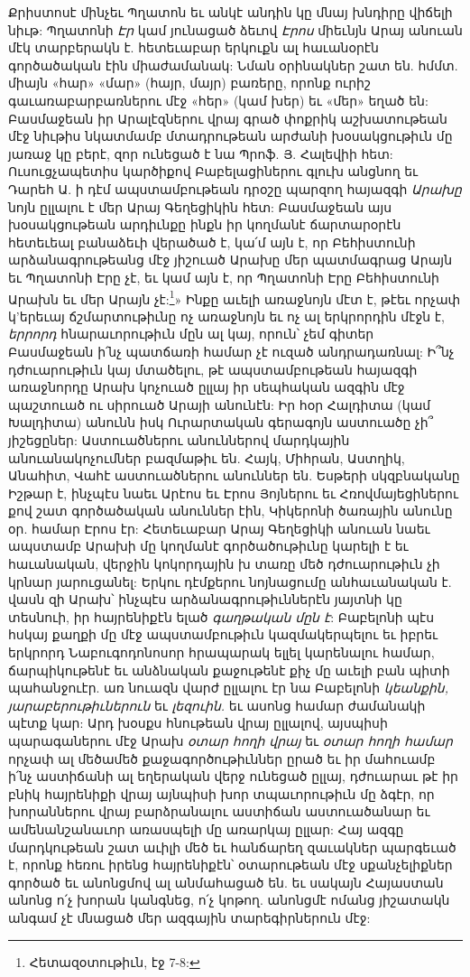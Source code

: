 \documentclass{article}
\begin{document}
{Քրիստոսէ մինչեւ Պղատոն եւ անկէ անդին կը մնայ խնդիրը վիճելի նիւթ: Պղատոնի \emph{Էր} կամ յունացած ձեւով \emph{Էրոս} միեւնյն Արայ անուան մէկ տարբերակն է. հետեւաբար երկուքն ալ հաւանօրէն գործածական էին միաժամանակ: Նման օրինակներ շատ են. հմմտ. միայն «հար» «մար» (հայր, մայր) բառերը, որոնք ուրիշ գաւառաբարբառներու մէջ «հեր» (կամ խեր) եւ «մեր» եղած են: Բասմաջեան իր Արալէզներու վրայ գրած փոքրիկ աշխատութեան մէջ նիւթիս նկատմամբ մտադրութեան արժանի խօսակցութիւն մը յառաջ կը բերէ, զոր ունեցած է նա Պրոֆ. Յ. Հալեվիի հետ: Ուսուցչապետիս կարծիքով Բաբելացիներու գլուխ անցնող եւ Դարեհ Ա. ի դէմ ապստամբութեան դրօշը պարզող հայազգի \emph{Արախը} նոյն ըլլալու է մեր Արայ Գեղեցիկին հետ: Բասմաջեան այս խօսակցութեան արդիւնքը ինքն իր կողմանէ ճարտարօրէն հետեւեալ բանաձեւի վերածած է, կա՛մ այն է, որ Բեհիստունի արձանագրութեանց մէջ յիշուած Արախը մեր պատմագրաց Արայն եւ Պղատոնի Էրը չէ, եւ կամ այն է, որ Պղատոնի Էրը Բեհիստունի Արախն եւ մեր Արայն չէ:\footnote{Հետազօտութիւն, էջ 7-8: }» Ինքը աւելի առաջնոյն մէտ է, թէեւ որչափ կ'երեւայ ճշմարտութիւնը ոչ առաջնոյն եւ ոչ ալ երկրորդին մէջն է, \emph{երրորդ} հնարաւորութիւն մըն ալ կայ, որուն՝ չեմ գիտեր Բասմաջեան ի՛նչ պատճառի համար չէ ուզած անդրադառնալ: Ի՞նչ դժուարութիւն կայ մտածելու, թէ ապստամբութեան հայազգի առաջնորդը Արախ կոչուած ըլլայ իր սեպհական ազգին մէջ պաշտուած ու սիրուած Արայի անունէն: Իր հօր Հալդիտա (կամ Խալդիտա) անունն իսկ Ուրարտական գերագոյն աստուածը չի՞ յիշեցըներ: Աստուածներու անուններով մարդկային անուանակոչումներ բազմաթիւ են. Հայկ, Միհրան, Աստղիկ, Անահիտ, Վահէ աստուածներու անուններ են. Եսթերի սկզբնականը Իշթար է, ինչպէս նաեւ Արէոս եւ Էրոս Յոյներու եւ Հռովմայեցիներու քով շատ գործածական անուններ էին, Կիկերոնի ծառային անունը օր. համար Էրոս էր: Հետեւաբար Արայ Գեղեցիկի անուան նաեւ ապստամբ Արախի մը կողմանէ գործածութիւնը կարելի է եւ հաւանական, վերջին կոկորդային խ տառը մեծ դժուարութիւն չի կրնար յարուցանել: Երկու դէմքերու նոյնացումը անհաւանական է. վասն զի Արախ՝ ինչպէս արձանագրութիւններէն յայտնի կը տեսնուի, իր հայրենիքէն ելած \emph{գաղթական մըն է}: Բաբելոնի պէս հսկայ քաղքի մը մէջ ապստամբութիւն կազմակերպելու եւ իբրեւ երկրորդ Նաբուգոդոնոսոր հրապարակ ելլել կարենալու համար, ճարպիկութենէ եւ անձնական քաջութենէ քիչ մը աւելի բան պիտի պահանջուէր. առ նուազն վարժ ըլլալու էր նա Բաբելոնի \emph{կեանքին, յարաբերութիւներուն} եւ \emph{լեզուին.} եւ ասոնց համար ժամանակի պէտք կար: Արդ խօսքս հնութեան վրայ ըլլալով, այսպիսի պարագաներու մէջ Արախ \emph{օտար հողի վրայ} եւ \emph{օտար հողի համար} որչափ ալ մեծամեծ քաջագործութիւններ ըրած եւ իր մահուամբ ի՛նչ աստիճանի ալ եղերական վերջ ունեցած ըլլայ, դժուարաւ թէ իր բնիկ հայրենիքի վրայ այնպիսի խոր տպաւորութիւն մը ձգէր, որ խորաններու վրայ բարձրանալու աստիճան աստուածանար եւ ամենանշանաւոր առասպելի մը առարկայ ըլլար: Հայ ազգը մարդկութեան շատ աւիլի մեծ եւ հանճարեղ զաւակներ պարգեւած է, որոնք հեռու իրենց հայրենիքէն՝ օտարութեան մէջ սքանչելիքներ գործած եւ անոնցմով ալ անմահացած են. եւ սակայն Հայաստան անոնց ո՛չ խորան կանգնեց, ո՛չ կոթող. անոնցմէ ոմանց յիշատակն անգամ չէ մնացած մեր ազգային տարեգիրներուն մէջ:

}
\end{document}
